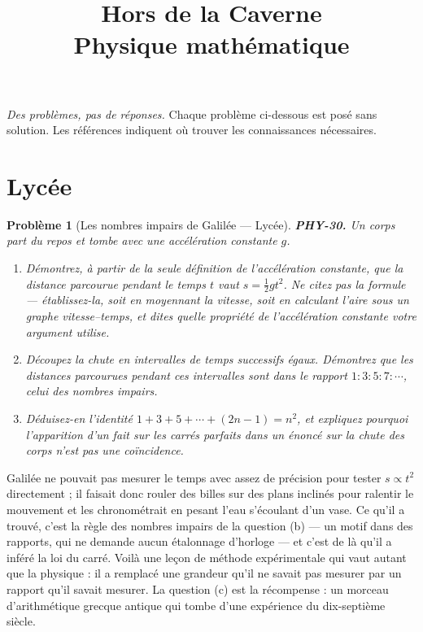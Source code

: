\documentclass[11pt]{article}
\title{Hors de la Caverne \\ \Large Physique mathématique}
\author{}
\date{}
\newtheorem{problem}{Problème}
\begin{document}
\maketitle
\noindent\emph{Des problèmes, pas de réponses.} Chaque problème ci-dessous est posé
sans solution. Les références indiquent où trouver les connaissances nécessaires.
\medskip


\section*{Lycée}

\begin{problem}[{Les nombres impairs de Galilée --- Lycée}]
\textbf{PHY-30.} Un corps part du repos et tombe avec une accélération constante $ g $.
\begin{enumerate}
\item[(a)] Démontrez, à partir de la seule définition de l'accélération constante, que la distance
parcourue pendant le temps $ t $ vaut $ s = \tfrac{1}{2} g t^{2} $. Ne citez pas la formule ---
établissez-la, soit en moyennant la vitesse, soit en calculant l'aire sous un graphe
vitesse--temps, et dites quelle propriété de l'accélération constante votre argument utilise.
\item[(b)] Découpez la chute en intervalles de temps successifs égaux. Démontrez que les distances
parcourues pendant ces intervalles sont dans le rapport $ 1 : 3 : 5 : 7 : \cdots $, celui des
nombres impairs.
\item[(c)] Déduisez-en l'identité $ 1 + 3 + 5 + \cdots + (2n-1) = n^{2} $, et expliquez pourquoi
l'apparition d'un fait sur les carrés parfaits dans un énoncé sur la chute des corps n'est pas
une coïncidence.
\end{enumerate}

\end{problem}

\noindent Galilée ne pouvait pas mesurer le temps avec assez de précision pour tester
$ s \propto t^{2} $ directement ; il faisait donc rouler des billes sur des plans inclinés pour
ralentir le mouvement et les chronométrait en pesant l'eau s'écoulant d'un vase. Ce qu'il a
trouvé, c'est la règle des nombres impairs de la question (b) --- un motif dans des rapports, qui
ne demande aucun étalonnage d'horloge --- et c'est de là qu'il a inféré la loi du carré. Voilà une
leçon de méthode expérimentale qui vaut autant que la physique : il a remplacé une grandeur qu'il
ne savait pas mesurer par un rapport qu'il savait mesurer. La question (c) est la récompense : un
morceau d'arithmétique grecque antique qui tombe d'une expérience du dix-septième siècle.
\end{document}
